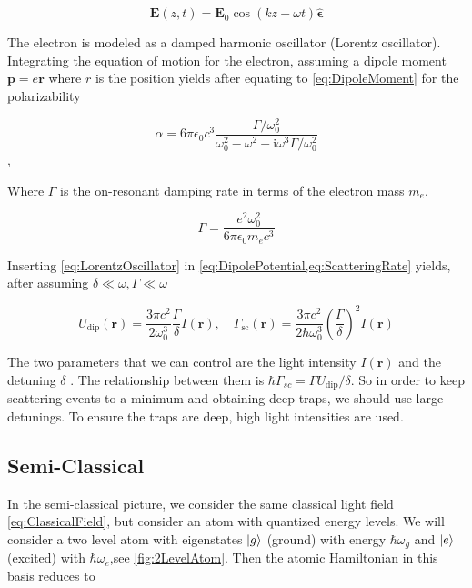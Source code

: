 \begin{equation}\label{eq:ClassicalField}
	\mathbf{E}(z,t) = \mathbf{E}_0 \cos{(k z - \omega t)} 	\bm{\hat{\epsilon}}
\end{equation}
	 
The electron is modeled as a damped harmonic oscillator (Lorentz oscillator). Integrating the equation of motion for the electron, assuming a dipole moment $\mathbf{p} = e \mathbf{r}$ where $r$ is the position yields after equating to \cref{eq:DipoleMoment} for the polarizability \cite{Grimm2000}

\begin{equation}\label{eq:LorentzOscillator}
	\alpha=6 \pi \epsilon_{0} c^{3} \frac{\Gamma / \omega_{0}^{2}}{\omega_{0}^{2}-\omega^{2}-\mathrm{i}\omega^3\Gamma/\omega_0^2}
\end{equation},

Where $\Gamma$ is the on-resonant damping rate in terms of the electron mass $m_e$. 

\begin{equation}\label{eq:ResonantDampingRate}
	\Gamma = \frac{e^2 \omega_0^2}{6\pi \epsilon_0 m_e c^3}
\end{equation}

Inserting \cref{eq:LorentzOscillator} in \cref{eq:DipolePotential,eq:ScatteringRate} yields, after assuming $\delta \ll \omega, \Gamma \ll \omega$

\begin{equation}\label{eq:DipoleClassicalResult} 
	U_{\text{dip}}(\mathbf{r}) = 
	\frac{3\pi c^2}{2\omega_0^3}\frac{\Gamma}{\delta} I(\mathbf{r}),
	\quad
	\Gamma_{\text{sc}}(\mathbf{r}) = 
	\frac{3\pi c^2}{2\hbar\omega_0^3}\left(\frac{\Gamma}{\delta}\right)^2 I(\mathbf{r})
\end{equation}

The two parameters that we can control are the light intensity $I(\mathbf{r})$ and the detuning $\delta$ \cite{Grimm2000}. The relationship between them is $\hbar \Gamma_{sc} =\Gamma U_{\text{dip}}/\delta$. So in order to keep scattering events to a minimum and obtaining deep traps, we should use large detunings. To ensure the traps are deep, high light intensities are used. 

\subsection{Semi-Classical}

In the semi-classical picture, we consider the same classical light field \cref{eq:ClassicalField}, but consider an atom with quantized energy levels. We will consider a two level atom with eigenstates $\lvert g\rangle$ (ground) with energy $\hbar \omega_g$ and $\lvert e\rangle$ (excited) with $\hbar \omega_e$,see \cref{fig:2LevelAtom}. Then the atomic Hamiltonian in this basis reduces to \cite{Loudon2000}

